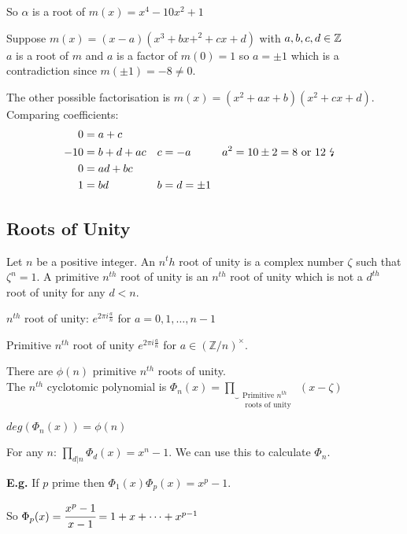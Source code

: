 \documentclass[11pt]{article}
\begin{document}
So $\alpha $ is a root of $m(x) = x^4 - 10x^2 + 1$

Suppose $m(x) = (x-a)(x^3+bx+^2+cx+d) $ with $a,b,c,d \in \mathbb{Z}$
$ $\\

$a $ is a root of $m$ and $a$ is a factor of $m(0) = 1$ so $a = \pm 1$ which is a contradiction since $m(\pm 1) = -8 \neq 0.$

The other possible factorisation is $m(x) = (x^2 + ax+b)(x^2+cx+d)$.
Comparing coefficients:
\begin{align*}
	0 &= a+c && \\
	-10 &= b+d+ac && c = -a &&a^2 = 10 \pm 2 = 8 \text{ or } 12 \text{ \lightning} \\ 
	0 &= ad+bc\\
	1 &= bd && b=d=\pm 1\\
\end{align*}


\subsection{Roots of Unity}
Let $n$ be a positive integer. 
An $n^th$ root of unity is a complex number $\zeta$ such that $\zeta^n = 1$.
A primitive $n^{th}$ root of unity is an $n^{th}$ root of unity which is not a $d^{th}$ root of unity for any $d<n$.


$n^{th}$ root of unity: $e^{2\pi i \frac{a}{n}}$ for $a = 0,1,\dots,n-1$

Primitive $n^{th}$ root of unity $e^{2\pi i \frac{a}{n}}$ for $a \in (\mathbb{Z}/n)^\times$.

There are $\phi(n)$ primitive $n^{th}$ roots of unity.
$ $\\[1em]
The $n^{th} $ cyclotomic polynomial is $\Phi_n(x) = \underbrace{\prod}_{\substack{\text{Primitive $n^{th}$} \\ \text{ roots of unity }}} (x - \zeta)$

$deg(\Phi_n(x)) = \phi(n)$





\begin{lemma}
	For any $n$: $\prod_{d|n} \Phi_d(x) = x^n - 1$.
	We can use this to calculate $\Phi_n$.
\end{lemma}
$ $\\
\textbf{E.g.} If $p$ prime then $\Phi_1(x)\Phi_p(x) = x^p -1 $.

So $\Phi_p(x) = \cfrac{x^p-1}{x-1} = 1+x+\dots + x^{p-1}$
\end{document}
